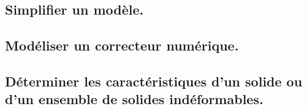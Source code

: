 \documentclass[10pt,fleqn]{article}
\newcommand{\repRel}{../..}
\newcommand{\repStyle}{\repRel/Style}
\newcommand{\td}{fichier_td}
\newcommand{\repExos}{\repRel/ExercicesCompetences}
\newcommand{\repExo}{dossier}
\begin{document}
\begin{multicols}{2}
\renewcommand{\repExo}{\repExos/B2_ProposerModele/B2_07_ModelisationSchemaBlocs/71_Robovolc}
\renewcommand{\td}{71_Robovolc}
\graphicspath{{\repStyle/png/}{\repExo/images/}}


\renewcommand{\repExo}{\repExos/B2_ProposerModele/B2_07_ModelisationSchemaBlocs/77_ProtheseTibia}
\renewcommand{\td}{77_ProtheseTibia}
\graphicspath{{\repStyle/png/}{\repExo/images/}}


\renewcommand{\repExo}{\repExos/B2_ProposerModele/B2_07_ModelisationSchemaBlocs/78_RobotDaVinci}
\renewcommand{\td}{78_RobotDaVinci}
\graphicspath{{\repStyle/png/}{\repExo/images/}}


\renewcommand{\repExo}{\repExos/B2_ProposerModele/B2_07_ModelisationSchemaBlocs/79_Tuyere}
\renewcommand{\td}{79_Tuyere}
\graphicspath{{\repStyle/png/}{\repExo/images/}}


\renewcommand{\repExo}{\repExos/B2_ProposerModele/B2_07_ModelisationSchemaBlocs/80_Clever}
\renewcommand{\td}{80_Clever}
\graphicspath{{\repStyle/png/}{\repExo/images/}}


\end{multicols}

\subsection{Simplifier un modèle.} 

\begin{multicols}{2} 

\end{multicols}

\subsection{Modéliser un correcteur numérique. } 

\begin{multicols}{2} 

\end{multicols}

\subsection{Déterminer les caractéristiques d'un solide ou d'un ensemble de solides indéformables.} 
\end{document}

